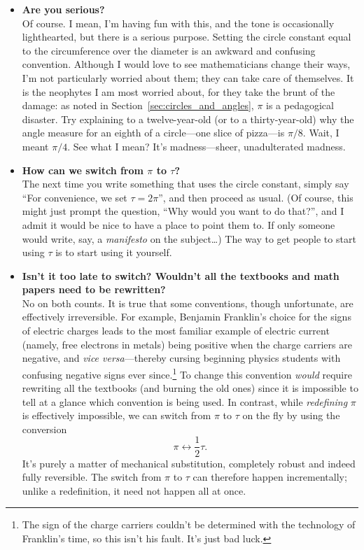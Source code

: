 \begin{itemize}

  \item \textbf{Are you serious?} \\ Of course. I mean, I'm having fun with this, and the tone is occasionally lighthearted, but there is a serious purpose. Setting the circle constant equal to the circumference over the diameter is an awkward and confusing convention. Although I would love to see mathematicians change their ways, I'm not particularly worried about them; they can take care of themselves. It is the neophytes I am most worried about, for they take the brunt of the damage: as noted in Section~\ref{sec:circles_and_angles}, $\pi$ is a pedagogical disaster. Try explaining to a twelve-year-old (or to a thirty-year-old) why the angle measure for an eighth of a circle---one slice of pizza---is $\pi/8$. Wait, I meant $\pi/4$. See what I mean? It's madness---sheer, unadulterated madness.

  \item \textbf{How can we switch from $\pi$ to $\tau$?} \\ The next time you write something that uses the circle constant, simply say ``For convenience, we set $\tau = 2\pi$'', and then proceed as usual. (Of course, this might just prompt the question, ``Why would you want to do that?'', and I admit it would be nice to have a place to point them to. If only someone would write, say, a \emph{manifesto} on the subject\ldots) The way to get people to start using $\tau$ is to start using it yourself.

  \item \textbf{Isn't it too late to switch? Wouldn't all the textbooks and math papers need to be rewritten?} \\ No on both counts. It is true that some conventions, though unfortunate, are effectively irreversible. For example, Benjamin Franklin's choice for the signs of electric charges leads to the most familiar example of electric current (namely, free electrons in metals) being positive when the charge carriers are negative, and \emph{vice versa}---thereby cursing beginning physics students with confusing negative signs ever since.\footnote{The sign of the charge carriers couldn't be determined with the technology of Franklin's time, so this isn't his fault. It's just bad luck.} To change this convention \emph{would} require rewriting all the textbooks (and burning the old ones) since it is impossible to tell at a glance which convention is being used. In contrast, while \emph{redefining} $\pi$ is effectively impossible, we can switch from $\pi$ to $\tau$ on the fly by using the conversion \[ \pi \leftrightarrow \textstyle{\frac{1}{2}}\tau. \] It's purely a matter of mechanical substitution, completely robust and indeed fully reversible. The switch from $\pi$ to $\tau$ can therefore happen incrementally; unlike a redefinition, it need not happen all at once.


\end{itemize}
